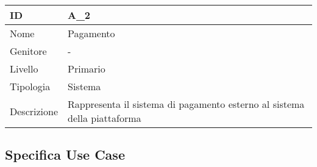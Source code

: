 \begin{center}
\begin{tabular}{ |p{2cm}|p{10cm}|  }
\hline
ID & A\_2 \\\hline
Nome & Pagamento\\\hline
Genitore & - \\\hline
Livello &  Primario \\\hline
Tipologia & Sistema \\\hline
Descrizione &  Rappresenta il sistema di pagamento esterno al sistema della piattaforma \\\hline
\end{tabular}
\label{table_attore:2}\newline


\subsection{Specifica Use Case}


\end{center}
